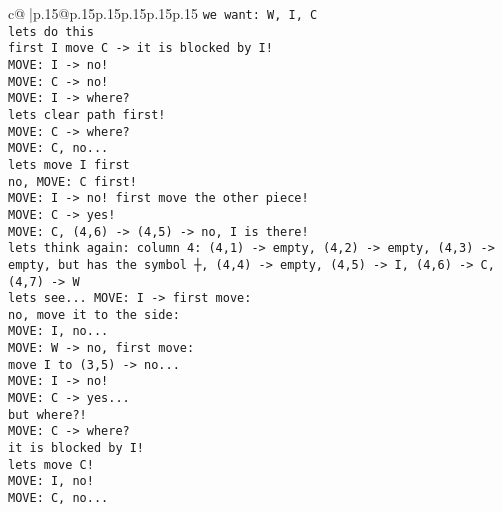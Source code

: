 \documentclass{article}
\begin{document}
{\begin{supertabular}{c@{$\;$}|p{.15\linewidth}@{}p{.15\linewidth}p{.15\linewidth}p{.15\linewidth}p{.15\linewidth}p{.15\linewidth}}
{{{\tt  we want: W, I, C \\ \tt  lets do this \\ \tt  first I move C -> it is blocked by I!\\ \tt  MOVE: I -> no! \\ \tt  MOVE: C -> no! \\ \tt  MOVE: I -> where? \\ \tt  lets clear path first!\\ \tt  MOVE: C -> where? \\ \tt  MOVE: C, no... \\ \tt  lets move I first \\ \tt  no, MOVE: C first!\\ \tt  MOVE: I -> no! first move the other piece!\\ \tt  MOVE: C -> yes!\\ \tt  MOVE: C, (4,6) -> (4,5) -> no, I is there!\\ \tt  lets think again: column 4: (4,1) -> empty, (4,2) -> empty, (4,3) -> empty, but has the symbol ┼, (4,4) -> empty, (4,5) -> I, (4,6) -> C, (4,7) -> W\\ \tt  lets see... MOVE: I -> first move: \\ \tt  no, move it to the side: \\ \tt  MOVE: I, no...\\ \tt  MOVE: W -> no, first move: \\ \tt  move I to (3,5) -> no...\\ \tt  MOVE: I -> no!\\ \tt  MOVE: C -> yes...\\ \tt  but where?!\\ \tt  MOVE: C -> where? \\ \tt  it is blocked by I!\\ \tt  lets move C!\\ \tt  MOVE: I, no!\\ \tt  MOVE: C, no... \\ }}}
\end{supertabular}}
\end{document}
